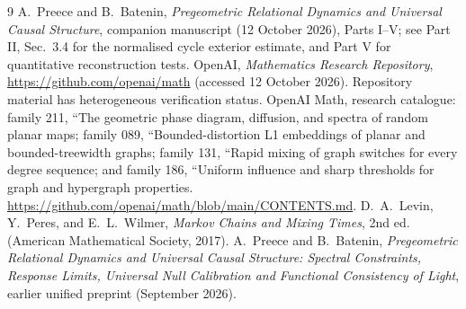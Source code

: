 \documentclass[11pt,a4paper]{article}
\numberwithin{equation}{section}
\newcommand{\1}{\mathbf{1}}
\begin{document}
\begin{thebibliography}{9}
A.~Preece and B.~Batenin, \emph{Pregeometric Relational Dynamics and Universal Causal Structure}, companion manuscript (12 October 2026), Parts I--V; see Part II, Sec.~3.4 for the normalised cycle exterior estimate, and Part V for quantitative reconstruction tests.
OpenAI, \emph{Mathematics Research Repository}, \url{https://github.com/openai/math} (accessed 12 October 2026). Repository material has heterogeneous verification status.
OpenAI Math, research catalogue: family 211, ``The geometric phase diagram, diffusion, and spectra of random planar maps; family 089, ``Bounded-distortion L1 embeddings of planar and bounded-treewidth graphs; family 131, ``Rapid mixing of graph switches for every degree sequence; and family 186, ``Uniform influence and sharp thresholds for graph and hypergraph properties. \url{https://github.com/openai/math/blob/main/CONTENTS.md}.
D.~A.~Levin, Y.~Peres, and E.~L.~Wilmer, \emph{Markov Chains and Mixing Times}, 2nd ed. (American Mathematical Society, 2017).
A.~Preece and B.~Batenin, \emph{Pregeometric Relational Dynamics and Universal Causal Structure: Spectral Constraints, Response Limits, Universal Null Calibration and Functional Consistency of Light}, earlier unified preprint (September 2026).
\end{thebibliography}
\end{document}
